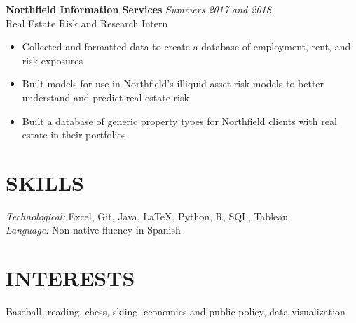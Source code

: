 \documentclass[margin, 10.85pt]{res} %
\begin{document}
\begin{resume}
{\sl} \textbf{Northfield Information Services} \hfill \textit{Summers 2017 and 2018}\smallskip\\
{\sl} Real Estate Risk and Research Intern \smallskip
{\sl} \begin{itemize}
\item Collected and formatted data to create a database of employment, rent, and risk exposures
\item Built models for use in Northfield's illiquid asset risk models to better understand and predict real estate risk
\item Built a database of generic property types for Northfield clients with real estate in their portfolios
\end{itemize}


\section{SKILLS}
{\sl Technological:} Excel, Git, Java, LaTeX, Python, R, SQL, Tableau \smallskip \\
{\sl Language:} Non-native fluency in Spanish

\section{INTERESTS}
{\sl} Baseball, reading, chess, skiing, economics and public policy, data visualization


\end{resume}
\end{document}
